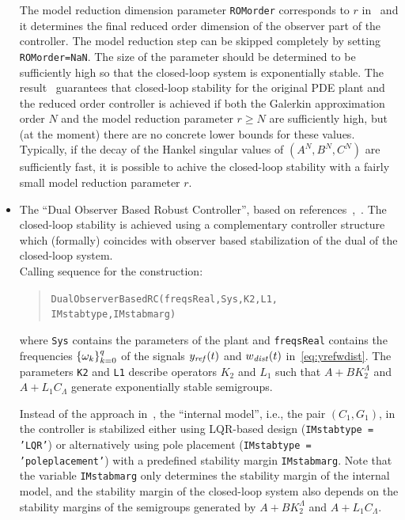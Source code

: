 \documentclass[11pt, a4paper]{amsart}
\newcommand{\CL}{C_\Lambda}
\theoremstyle{definition}
\numberwithin{equation}{section}
\newcommand{\yref}{y_{\mbox{\scriptsize\textit{ref}}}}
\newcommand{\wdist}{w_{\mbox{\scriptsize\textit{dist}}}}
\begin{document}
\begin{itemize}
The model reduction dimension parameter \texttt{ROMorder} corresponds to $r$ in~ and it determines the final reduced order dimension of the observer part of the controller. The model reduction step can be skipped completely by setting \texttt{ROMorder=NaN}. The size of the parameter should be determined to be sufficiently high so that the closed-loop system is exponentially stable. The result~ guarantees that closed-loop stability for the original PDE plant and the reduced order controller is achieved if both the Galerkin approximation order $N$ and the model reduction parameter $r\geq N$ are sufficiently high, but (at the moment) there are no concrete lower bounds for these values. Typically, if the decay of the Hankel singular values of $(A^N,B^N,C^N)$ are sufficiently fast, it is possible to achive the closed-loop stability with a fairly small model reduction parameter $r$.

	\bigskip

  \item The ``Dual Observer Based Robust Controller'', based on references~,~. The closed-loop stability is achieved using a complementary controller structure which (formally) coincides with observer based stabilization of the dual of the closed-loop system.\\[1ex]
      Calling sequence for the construction:\\[-1ex]
     \begin{quotation}
       \texttt{DualObserverBasedRC(freqsReal,Sys,K2,L1,\\
	 \phantom{a}\hspace{3.7cm} IMstabtype,IMstabmarg)}
     \end{quotation}
     \medskip
     where \texttt{Sys} contains the parameters of the plant and \texttt{freqsReal} contains the frequencies $\{\omega_k\}_{k=0}^q$ of the signals $\yref(t)$ and $\wdist(t)$ in~\eqref{eq:yrefwdist}. The parameters \texttt{K2} and \texttt{L1} describe operators $K_2$ and $L_1$ such that $A+BK_2^\Lambda$ and $A+L_1\CL$ generate exponentially stable semigroups.

     Instead of the approach in~\cite{Pau16a}, the ``internal model'', i.e., the pair $(C_1,G_1)$, in the controller is stabilized either using LQR-based design (\texttt{IMstabtype = 'LQR'}) or alternatively using pole placement (\texttt{IMstabtype = 'poleplacement'}) with a predefined stability margin \texttt{IMstabmarg}. Note that the variable \texttt{IMstabmarg} only determines the stability margin of the internal model, and the stability margin of the closed-loop system also depends on the stability margins of the semigroups generated by $A+BK_2^\Lambda$ and $A+L_1\CL$.


\end{itemize}
\end{document}
